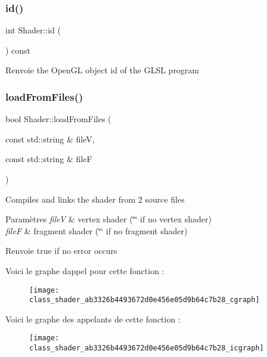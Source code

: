 \subsubsection{\texorpdfstring{id()}{id()}}
{\footnotesize\ttfamily int Shader\+::id (\begin{DoxyParamCaption}{ }\end{DoxyParamCaption}) const\hspace{0.3cm}{\ttfamily [inline]}}

\begin{DoxyReturn}{Renvoie}
the Open\+GL object id of the G\+L\+SL program 
\end{DoxyReturn}
\mbox{\label{class_shader_ab3326b4493672d0e456e05d9b64c7b28}} 
\subsubsection{\texorpdfstring{load\+From\+Files()}{loadFromFiles()}}
{\footnotesize\ttfamily bool Shader\+::load\+From\+Files (\begin{DoxyParamCaption}\item[{const std\+::string \&}]{fileV,  }\item[{const std\+::string \&}]{fileF }\end{DoxyParamCaption})}

Compiles and links the shader from 2 source files 
\begin{DoxyParams}{Paramètres}
{\em fileV} & vertex shader (\char`\"{}\char`\"{} if no vertex shader) \\
\hline
{\em fileF} & fragment shader (\char`\"{}\char`\"{} if no fragment shader) \\
\hline
\end{DoxyParams}
\begin{DoxyReturn}{Renvoie}
true if no error occurs 
\end{DoxyReturn}
Voici le graphe d\textquotesingle{}appel pour cette fonction \+:\nopagebreak
\begin{figure}[H]
\begin{center}
\leavevmode
\texttt{[image: class\_shader\_ab3326b4493672d0e456e05d9b64c7b28\_cgraph]}
\end{center}
\end{figure}
Voici le graphe des appelants de cette fonction \+:\nopagebreak
\begin{figure}[H]
\begin{center}
\leavevmode
\texttt{[image: class\_shader\_ab3326b4493672d0e456e05d9b64c7b28\_icgraph]}
\end{center}
\end{figure}
\mbox{\label{class_shader_ac849c6315a283ebf04571ca62000c187}} 
